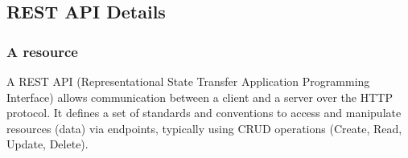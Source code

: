 \subsection{REST API Details}


\subsubsection*{A resource}


A REST API (Representational State Transfer Application Programming Interface) allows communication between a client and a server over the HTTP protocol. It defines a set of standards and conventions to access and manipulate resources (data) via endpoints, typically using CRUD operations (Create, Read, Update, Delete).




